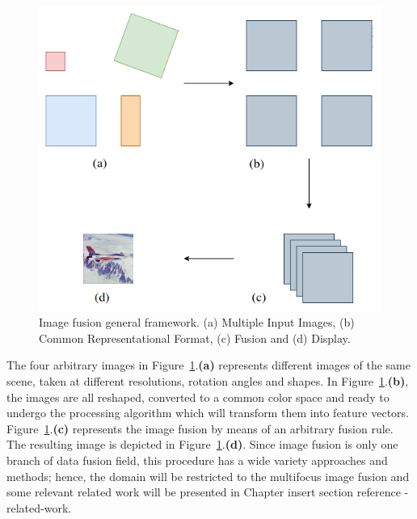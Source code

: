 \begin{figure}[H]
	\centering
	\caption{\label{fig:fusion_general_framework}Image fusion general framework. (a) Multiple Input Images, (b) Common Representational Format, (c) Fusion and (d) Display.}
	\begin{center}
    \includegraphics[scale=0.4]{images/image_fusion_scheme.png}
	\end{center}
	\centering
    \fautor
\end{figure}

The four arbitrary images in Figure~\ref{fig:fusion_general_framework}.\textbf{(a)} represents different images of the same scene, taken at different resolutions, rotation angles and shapes. In Figure~\ref{fig:fusion_general_framework}.\textbf{(b)}, the images are all reshaped, converted to a common color space and ready to undergo the processing algorithm which will transform them into feature vectors. Figure~\ref{fig:fusion_general_framework}.\textbf{(c)} represents the image fusion by means of an arbitrary fusion rule. The resulting image is depicted in Figure~\ref{fig:fusion_general_framework}.\textbf{(d)}. Since image fusion is only one branch of data fusion field, this procedure has a wide variety approaches and methods; hence, the domain will be restricted to the multifocus image fusion and some relevant related work will be presented in Chapter {\color{red} insert section reference - related-work}.